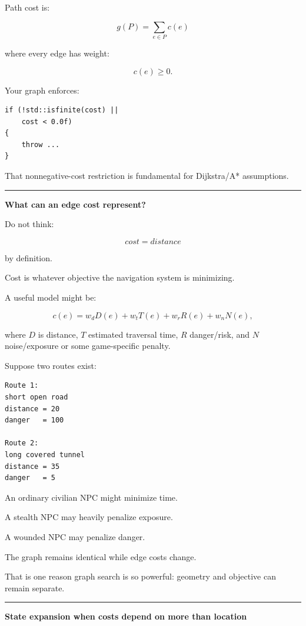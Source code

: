 Path cost is:

\[
\boxed{
g(P)=
\sum_{e\in P}c(e)
}
\]

where every edge has weight:

\[
c(e)\ge0.
\]

Your graph enforces:

\begin{verbatim}
if (!std::isfinite(cost) ||
    cost < 0.0f)
{
    throw ...
}
\end{verbatim}

That nonnegative-cost restriction is fundamental for Dijkstra/A* assumptions.

\begin{center}\rule{0.5\linewidth}{0.5pt}\end{center}

\textbf{What can an edge cost represent?}

Do not think:

\[
cost = distance
\]

by definition.

Cost is whatever objective the navigation system is minimizing.

A useful model might be:

\[
c(e)
=
w_dD(e)
+
w_tT(e)
+
w_rR(e)
+
w_nN(e),
\]

where \(D\) is distance, \(T\) estimated traversal time, \(R\) danger/risk, and \(N\) noise/exposure or some game-specific penalty.

Suppose two routes exist:

\begin{verbatim}
Route 1:
short open road
distance = 20
danger   = 100

Route 2:
long covered tunnel
distance = 35
danger   = 5
\end{verbatim}

An ordinary civilian NPC might minimize time.

A stealth NPC may heavily penalize exposure.

A wounded NPC may penalize danger.

The graph remains identical while edge costs change.

That is one reason graph search is so powerful: geometry and objective can remain separate.

\begin{center}\rule{0.5\linewidth}{0.5pt}\end{center}

\textbf{State expansion when costs depend on more than location}

